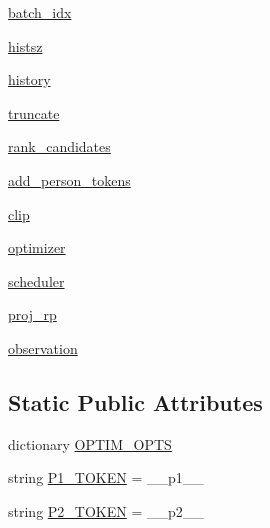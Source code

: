 \begin{DoxyCompactItemize}
\item 
\hyperlink{classparlai_1_1agents_1_1legacy__agents_1_1seq2seq_1_1torch__agent__v1_1_1TorchAgent_a31b5e2e435a70f40ce155dabe831d41c}{batch\+\_\+idx}
\item 
\hyperlink{classparlai_1_1agents_1_1legacy__agents_1_1seq2seq_1_1torch__agent__v1_1_1TorchAgent_add94f2eee8d2a4aba14869587e9dd4d3}{histsz}
\item 
\hyperlink{classparlai_1_1agents_1_1legacy__agents_1_1seq2seq_1_1torch__agent__v1_1_1TorchAgent_a858bd7d01a3d6298f2e2f72efcf73953}{history}
\item 
\hyperlink{classparlai_1_1agents_1_1legacy__agents_1_1seq2seq_1_1torch__agent__v1_1_1TorchAgent_ac0286e4dbf6dc71bda0c364851de5f22}{truncate}
\item 
\hyperlink{classparlai_1_1agents_1_1legacy__agents_1_1seq2seq_1_1torch__agent__v1_1_1TorchAgent_ab768649f4b4a30eb9a75fedde5a9935f}{rank\+\_\+candidates}
\item 
\hyperlink{classparlai_1_1agents_1_1legacy__agents_1_1seq2seq_1_1torch__agent__v1_1_1TorchAgent_a81f970d715f2525ad342330a28703c5c}{add\+\_\+person\+\_\+tokens}
\item 
\hyperlink{classparlai_1_1agents_1_1legacy__agents_1_1seq2seq_1_1torch__agent__v1_1_1TorchAgent_a99254a4351798f66797e0a5a8ff855d5}{clip}
\item 
\hyperlink{classparlai_1_1agents_1_1legacy__agents_1_1seq2seq_1_1torch__agent__v1_1_1TorchAgent_a2524bfb4b01626290e6fa26be52f2a80}{optimizer}
\item 
\hyperlink{classparlai_1_1agents_1_1legacy__agents_1_1seq2seq_1_1torch__agent__v1_1_1TorchAgent_aea16ae8f9536959afd6e7434d418a719}{scheduler}
\item 
\hyperlink{classparlai_1_1agents_1_1legacy__agents_1_1seq2seq_1_1torch__agent__v1_1_1TorchAgent_a3f1da649c485f406076be7bf84b2d4ee}{proj\+\_\+rp}
\item 
\hyperlink{classparlai_1_1agents_1_1legacy__agents_1_1seq2seq_1_1torch__agent__v1_1_1TorchAgent_a04fa334c086cf9afa815a44f1948e625}{observation}
\end{DoxyCompactItemize}
\subsection*{Static Public Attributes}
\begin{DoxyCompactItemize}
\item 
dictionary \hyperlink{classparlai_1_1agents_1_1legacy__agents_1_1seq2seq_1_1torch__agent__v1_1_1TorchAgent_ae574bf3e21ff941060ae0f3dcb284d8d}{O\+P\+T\+I\+M\+\_\+\+O\+P\+TS}
\item 
string \hyperlink{classparlai_1_1agents_1_1legacy__agents_1_1seq2seq_1_1torch__agent__v1_1_1TorchAgent_a14e0236052fb45181b6717922c517537}{P1\+\_\+\+T\+O\+K\+EN} = \textquotesingle{}\+\_\+\+\_\+p1\+\_\+\+\_\+\textquotesingle{}
\item 
string \hyperlink{classparlai_1_1agents_1_1legacy__agents_1_1seq2seq_1_1torch__agent__v1_1_1TorchAgent_a50d73f48f3f951684afc094495473ec5}{P2\+\_\+\+T\+O\+K\+EN} = \textquotesingle{}\+\_\+\+\_\+p2\+\_\+\+\_\+\textquotesingle{}
\end{DoxyCompactItemize}


